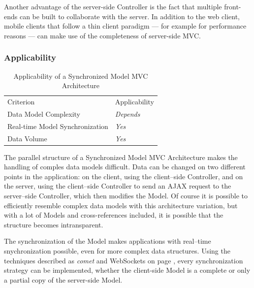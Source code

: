 Another advantage of the server-side Controller is the fact that multiple front-ends can be built to collaborate with the server. In addition to the web client, mobile clients that follow a thin client paradigm --- for example for performance reasons --- can make use of the completeness of server-side MVC.

\subsubsection{Applicability}
\begin{table}[H]
	\centering
	\begin{tabular}{l l}
\rowcolor{lightgray}
Criterion & Applicability\\
Data Model Complexity & \emph{Depends}\\
Real-time Model Synchronization & \emph{Yes}\\
Data Volume & \emph{Yes}\\
	\end{tabular}
	\caption{Applicability of a Synchronized Model MVC Architecture}
\end{table}

The parallel structure of a Synchronized Model MVC Architecture makes the handling of comples data models difficult. Data can be changed on two different points in the application: on the client, using the client--side Controller, and on the server, using the client--side Controller to send an AJAX request to the server--side Controller, which then modifies the Model. Of course it is possible to efficiently resemble complex data models with this architecture variation, but with a lot of Models and cross-references included, it is possible that the structure becomes intransparent.


The synchronization of the Model makes applications with real--time snychronization possible, even for more complex data structures. Using the techniques described as \emph{\gls{comet}} and WebSockets on page \pageref{term:comet}, every synchronization strategy can be implemented, whether the client-side Model is a complete or only a partial copy of the server-side Model.

